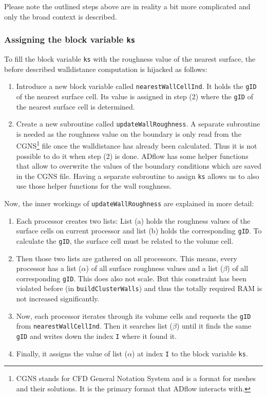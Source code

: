 \noindent Please note the outlined steps above are in reality a bit more
complicated and only the broad context is described.


\subsubsection{Assigning the block variable \texttt{ks}}
\label{subsubsec:propagate_ks}
To fill the block variable \texttt{ks} with the roughness value of the nearest
surface, the before described walldistance computation is hijacked as follows:

\begin{enumerate}[label=\Alph*]
  \item Introduce a new block variable called \texttt{nearestWallCellInd}. It
holds the \texttt{gID} of the nearest surface cell. Its value is assigned in
step (2) where the \texttt{gID} of the nearest surface cell is determined.

  \item Create a new subroutine called \texttt{updateWallRoughness}. A separate
subroutine is needed as the roughness value on the boundary is only read from
the CGNS\footnote{CGNS stands for CFD General Notation System and is a format
for meshes and their solutions. It is the primary format that ADflow interacts
with.} file once the walldistance has already been calculated. Thus it is not
possible to do it when step (2) is done. ADflow has some helper functions that
allow to overwrite the values of the boundary conditions which are saved in the
CGNS file. Having a separate subroutine to assign \texttt{ks} allows us to also use
those helper functions for the wall roughness.
\end{enumerate}

\noindent Now, the inner workings of \texttt{updateWallRoughness} are explained
in more detail:

\begin{enumerate}[label=\Alph*]
  \item Each processor creates two lists: List (a) holds the roughness values of
the surface cells on current processor and list (b) holds the corresponding
\texttt{gID}. To calculate the \texttt{gID}, the surface cell must be related to
the volume cell.

  \item Then those two lists are gathered on all processors. This means, every
processor has a list ($\alpha$) of all surface roughness values and a list
($\beta$) of all corresponding \texttt{gID}. This does also not scale. But this
constraint has been violated before (in \texttt{buildClusterWalls}) and thus the
totally required RAM is not increased significantly.

\item Now, each processor iterates through its volume cells and requests the
\texttt{gID} from \texttt{nearestWallCellInd}. Then it searches list ($\beta$)
until it finds the same \texttt{gID} and writes down the index \texttt{I} where
it found it.

\item Finally, it assigns the value of list ($\alpha$) at index \texttt{I} to the
block variable \texttt{ks}.
\end{enumerate}

